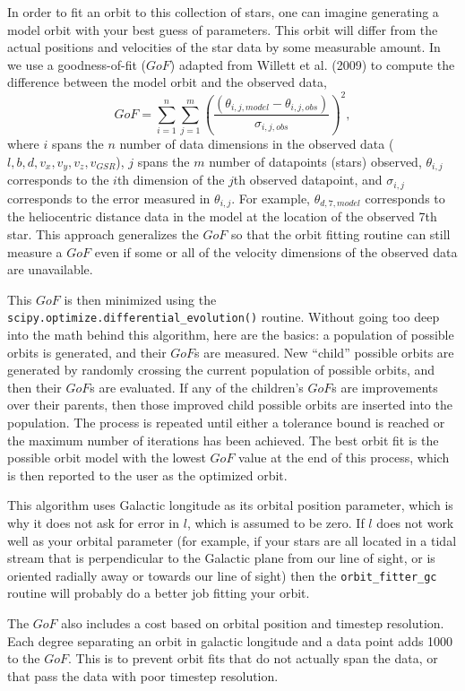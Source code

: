 \documentclass{article}
\begin{document}
In order to fit an orbit to this collection of stars, one can imagine generating a model orbit with your best guess of parameters. This orbit will differ from the actual positions and velocities of the star data by some measurable amount. In \mwahpy we use a goodness-of-fit ($GoF$) adapted from Willett et al. (2009) to compute the difference between the model orbit and the observed data, \[
GoF = \sum_{i=1}^n \sum_{j=1}^m \left( \frac{\left( \theta_{i,j,model} - \theta_{i,j,obs} \right)}{\sigma_{i,j,obs}} \right)^2,
\] where $i$ spans the $n$ number of data dimensions in the observed data ($l, b, d, v_x, v_y, v_z, v_{GSR}$), $j$ spans the $m$ number of datapoints (stars) observed, $\theta_{i,j}$ corresponds to the $i$th dimension of the $j$th observed datapoint, and $\sigma_{i,j}$ corresponds to the error measured in $\theta_{i,j}$. For example, $\theta_{d,7,model}$ corresponds to the heliocentric distance data in the model at the location of the observed 7th star. This approach generalizes the $GoF$ so that the orbit fitting routine can still measure a $GoF$ even if some or all of the velocity dimensions of the observed data are unavailable. 

This $GoF$ is then minimized using the \verb!scipy.optimize.differential_evolution()! routine. Without going too deep into the math behind this algorithm, here are the basics: a population of possible orbits is generated, and their $GoF$s are measured. New ``child'' possible orbits are generated by randomly crossing the current population of possible orbits, and then their $GoF$s are evaluated. If any of the children's $GoF$s are improvements over their parents, then those improved child possible orbits are inserted into the population. The process is repeated until either a tolerance bound is reached or the maximum number of iterations has been achieved. The best orbit fit is the possible orbit model with the lowest $GoF$ value at the end of this process, which is then reported to the user as the optimized orbit. 

This algorithm uses Galactic longitude as its orbital position parameter, which is why it does not ask for error in $l$, which is assumed to be zero.  If $l$ does not work well as your orbital parameter (for example, if your stars are all located in a tidal stream that is perpendicular to the Galactic plane from our line of sight, or is oriented radially away or towards our line of sight) then the \verb!orbit_fitter_gc! routine will probably do a better job fitting your orbit. 

The $GoF$ also includes a cost based on orbital position and timestep resolution. Each degree separating an orbit in galactic longitude and a data point adds 1000 to the $GoF$. This is to prevent orbit fits that do not actually span the data, or that pass the data with poor timestep resolution. 
\end{document}
